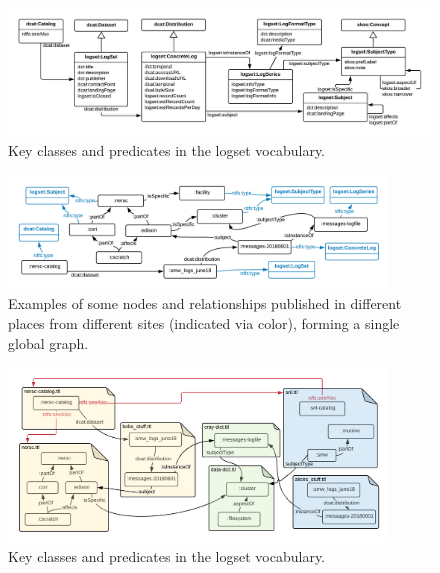 \begin{figure}
\includegraphics[width=1.0\textwidth]{logset-key-classes.png}
\caption{Key classes and predicates in the logset vocabulary. }
\label{f:logset-classes}
\end{figure}

\begin{figure}
\includegraphics[width=0.9\textwidth]{logset-classes-nodes.png}
\caption{Examples of some nodes and relationships published in different places 
from different sites (indicated via color), forming a single global graph. }
\label{f:logset-classes-nodes}
\end{figure}

\begin{figure}
\includegraphics[width=0.9\textwidth]{logset-example.png}
\caption{Key classes and predicates in the logset vocabulary. }
\label{f:logset-example}
\end{figure}

